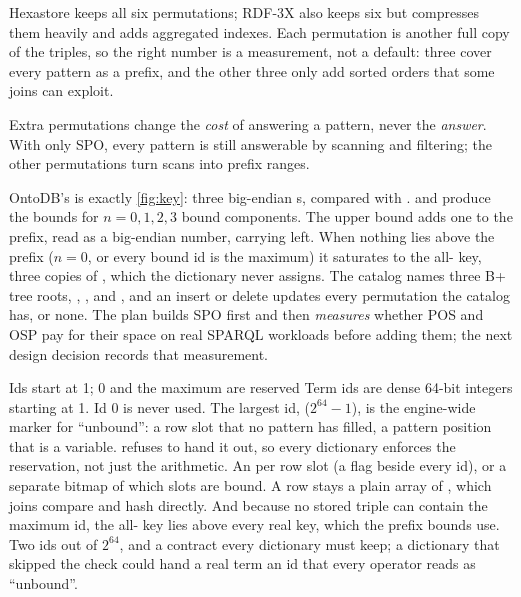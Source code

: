 Hexastore \cite{hexastore} keeps all six permutations; RDF-3X \cite{rdf3x} also
keeps six but compresses them heavily and adds aggregated indexes. Each
permutation is another full copy of the triples, so the right number is a
measurement, not a default: three cover every pattern as a prefix, and the
other three only add sorted orders that some joins can exploit.

\begin{keyidea}
Extra permutations change the \emph{cost} of answering a pattern, never the
\emph{answer}. With only SPO, every pattern is still answerable by scanning and
filtering; the other permutations turn scans into prefix ranges.
\end{keyidea}

\begin{ontodb}
OntoDB's  is exactly \cref{fig:key}: three big-endian
s, compared with .  and
 produce the bounds for $n = 0, 1, 2, 3$ bound
components. The upper bound adds one to the prefix, read as a big-endian
number, carrying left. When nothing lies above the prefix ($n = 0$, or every
bound id is the maximum) it saturates to the all- key, three copies of
, which the dictionary never assigns. The catalog names three B+ tree roots, , ,
and , and an insert or delete updates every permutation the catalog
has, or none. The plan builds SPO first and then \emph{measures} whether POS and
OSP pay for their space on real SPARQL workloads before adding them; the next
design decision records that measurement.
\end{ontodb}

\begin{decision}{Ids start at 1; 0 and the maximum are reserved}
 Term ids are dense 64-bit integers starting at 1. Id 0 is never
used. The largest id,  ($2^{64}-1$), is the engine-wide
marker for ``unbound'': a row slot that no pattern has filled, a pattern
position that is a variable.  refuses to hand
it out, so every dictionary enforces the reservation, not just the
arithmetic.
 An  per row slot (a flag beside every id),
or a separate bitmap of which slots are bound.
 A row stays a plain array of , which joins compare and
hash directly. And because no stored triple can contain the maximum id, the
all- key lies above every real key, which the prefix bounds use.
 Two ids out of $2^{64}$, and a contract every dictionary must keep;
a dictionary that skipped the check could hand a real term an id that every
operator reads as ``unbound''.
\end{decision}


